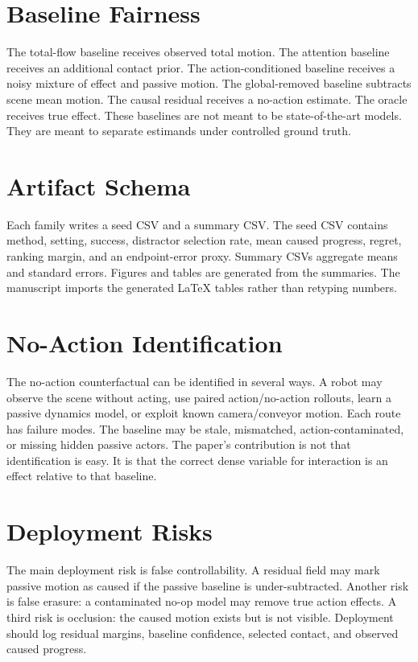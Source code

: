\documentclass{article}
\begin{document}
\section{Baseline Fairness}

The total-flow baseline receives observed total motion.  The attention baseline receives
an additional contact prior.  The action-conditioned baseline receives a noisy mixture of
effect and passive motion.  The global-removed baseline subtracts scene mean motion.  The
causal residual receives a no-action estimate.  The oracle receives true effect.  These
baselines are not meant to be state-of-the-art models.  They are meant to separate
estimands under controlled ground truth.

\section{Artifact Schema}

Each family writes a seed CSV and a summary CSV.  The seed CSV contains method, setting,
success, distractor selection rate, mean caused progress, regret, ranking margin, and an
endpoint-error proxy.  Summary CSVs aggregate means and standard errors.  Figures and
tables are generated from the summaries.  The manuscript imports the generated LaTeX
tables rather than retyping numbers.

\section{No-Action Identification}

The no-action counterfactual can be identified in several ways.  A robot may observe the
scene without acting, use paired action/no-action rollouts, learn a passive dynamics
model, or exploit known camera/conveyor motion.  Each route has failure modes.  The
baseline may be stale, mismatched, action-contaminated, or missing hidden passive actors.
The paper's contribution is not that identification is easy.  It is that the correct
dense variable for interaction is an effect relative to that baseline.

\section{Deployment Risks}

The main deployment risk is false controllability.  A residual field may mark passive
motion as caused if the passive baseline is under-subtracted.  Another risk is false
erasure: a contaminated no-op model may remove true action effects.  A third risk is
occlusion: the caused motion exists but is not visible.  Deployment should log residual
margins, baseline confidence, selected contact, and observed caused progress.
\end{document}
